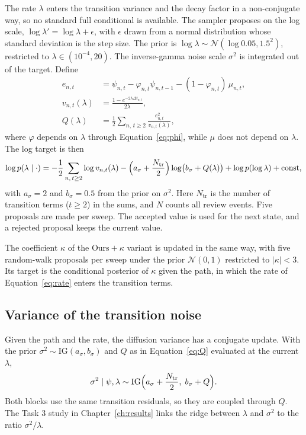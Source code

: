 The rate $\lambda$ enters the transition variance and the decay factor in a non-conjugate way, so
no standard full conditional is available. The sampler proposes on the log scale,
$\log\lambda' = \log\lambda + \epsilon$, with $\epsilon$ drawn from a normal distribution whose
standard deviation is the step size. The prior is $\log\lambda \sim \mathcal N(\log 0.05, 1.5^2)$,
restricted to $\lambda \in (10^{-4}, 20)$. The inverse-gamma noise scale $\sigma^2$ is integrated out
of the target. Define
\begin{align}\label{eq:S}
  e_{n,t} &= \psi_{n,t} - \varphi_{n,t}\psi_{n,t-1} - (1-\varphi_{n,t})\,\mu_{n,t},
  \\
  v_{n,t}(\lambda) &= \frac{1-e^{-2\lambda\Delta t_{n,t}}}{2\lambda}, \\
  Q(\lambda) &= \frac{1}{2}\sum_{n,\,t\ge 2}\frac{e_{n,t}^2}{v_{n,t}(\lambda)},\label{eq:Q}
\end{align}
where $\varphi$ depends on $\lambda$ through Equation~\eqref{eq:phi}, while $\mu$ does not depend on $\lambda$. The
log target is then
\begin{equation}\label{eq:lam-target}
  \log p(\lambda \mid \cdot) = -\frac{1}{2}\sum_{n,\,t\ge 2}\log v_{n,t}(\lambda)
  - \Bigl(a_\sigma + \frac{N_{\mathrm{tr}}}{2}\Bigr)\log\bigl(b_\sigma + Q(\lambda)\bigr)
  + \log p(\log\lambda) + \text{const},
\end{equation}
with $a_\sigma = 2$ and $b_\sigma = 0.5$ from the prior on $\sigma^2$. Here $N_{\mathrm{tr}}$ is the number of transition terms ($t \ge 2$) in the sums, and $N$ counts all review events. Five
proposals are made per sweep. The accepted value is used for the next state, and a rejected proposal
keeps the current value.

The coefficient $\kappa$ of the $\text{Ours}+\kappa$ variant is updated in the same way, with five
random-walk proposals per sweep under the prior $\mathcal N(0,1)$ restricted to $|\kappa| < 3$. Its target is the conditional posterior of $\kappa$ given the path, in which the rate of Equation~\eqref{eq:rate} enters the transition terms.

\subsection{Variance of the transition noise}
\label{sec:method-sigma}

Given the path and the rate, the diffusion variance has a conjugate update. With the prior
$\sigma^2 \sim \mathrm{IG}(a_\sigma, b_\sigma)$ and $Q$ as in Equation~\eqref{eq:Q} evaluated at the current $\lambda$,
\begin{equation}\label{eq:sigma2}
  \sigma^2 \mid \psi, \lambda \sim \mathrm{IG}\Bigl(a_\sigma + \frac{N_{\mathrm{tr}}}{2},\; b_\sigma + Q\Bigr).
\end{equation}
Both blocks use the same transition residuals, so they are coupled through $Q$. The Task 3 study in Chapter~\ref{ch:results} links the ridge between $\lambda$ and $\sigma^2$ to the ratio $\sigma^2/\lambda$.

